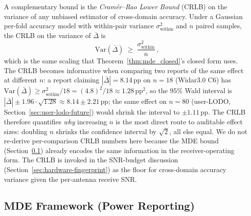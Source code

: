 \documentclass[11pt]{article}
\theoremstyle{definition}
\begin{document}
A complementary bound is the \emph{Cram\'er--Rao Lower Bound} (CRLB) on the variance of any unbiased estimator of cross-domain accuracy. Under a Gaussian per-fold accuracy model with within-pair variance $\sigma_\text{within}^2$ and $n$ paired samples, the CRLB on the variance of $\bar{\Delta}$ is
\begin{equation}
    \mathrm{Var}(\bar{\Delta}) \;\ge\; \frac{\sigma_\text{within}^2}{n}\,,
    \label{eq:crlb}
\end{equation}
which is the same scaling that Theorem~\ref{thm:mde_closed}'s closed form uses. The CRLB becomes informative when comparing two reports of the same effect at different $n$: a report claiming $|\bar{\Delta}| = 8.14$\,pp on $n = 18$ (Widar3.0 C6) has $\mathrm{Var}(\bar{\Delta}) \ge \sigma_\text{within}^2 / 18 = (4.8)^2 / 18 \approx 1.28\,\text{pp}^2$, so the $95\%$ Wald interval is $|\bar{\Delta}| \pm 1.96 \cdot \sqrt{1.28} \approx 8.14 \pm 2.21$\,pp; the same effect on $n = 80$ (user-LODO, Section~\ref{sec:user-lodo-future}) would shrink the interval to $\pm 1.11$\,pp. The CRLB therefore quantifies \emph{why} increasing $n$ is the most direct route to auditable effect sizes: doubling $n$ shrinks the confidence interval by $\sqrt{2}$, all else equal. We do not re-derive per-comparison CRLB numbers here because the MDE bound (Section~\ref{sec:mde_framework}) already encodes the same information in the receiver-operating form. The CRLB is invoked in the SNR-budget discussion (Section~\ref{sec:hardware-fingerprint}) as the floor for cross-domain accuracy variance given the per-antenna receive SNR.

\subsection{MDE Framework (Power Reporting)}
\label{sec:mde_framework}
\end{document}
